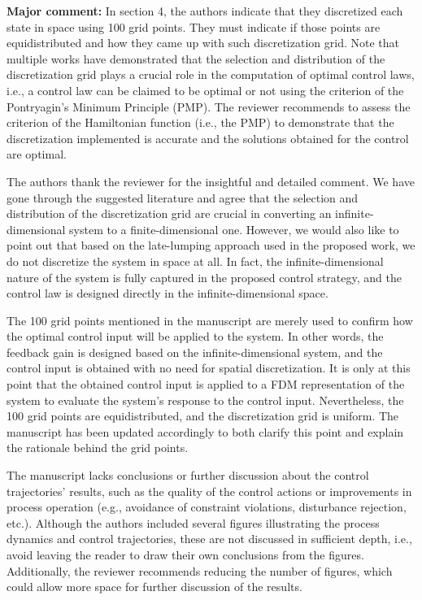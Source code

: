\documentclass[11pt,answers]{exam}
\begin{document}
\begin{questions}

    \question \textbf{Major comment: } In section 4, the authors indicate that they discretized each state in space using 100 grid points. They must indicate if those points are equidistributed and how they came up with such discretization grid. Note that multiple works \cite{palma2023selection, assassa2016optimality, chen2014bilevel} have demonstrated that the selection and distribution of the discretization grid plays a crucial role in the computation of optimal control laws, i.e., a control law can be claimed to be optimal or not using the criterion of the Pontryagin's Minimum Principle (PMP). The reviewer recommends to assess the criterion of the Hamiltonian function (i.e., the PMP) to demonstrate that the discretization implemented is accurate and the solutions obtained for the control are optimal.

    \begin{solutionorbox} \label{comment:3_1}
        The authors thank the reviewer for the insightful and detailed comment. We have gone through the suggested literature and agree that the selection and distribution of the discretization grid are crucial in converting an infinite-dimensional system to a finite-dimensional one. However, we would also like to point out that based on the late-lumping approach used in the proposed work, we do not discretize the system in space at all. In fact, the infinite-dimensional nature of the system is fully captured in the proposed control strategy, and the control law is designed directly in the infinite-dimensional space.

        The 100 grid points mentioned in the manuscript are merely used to confirm how the optimal control input will be applied to the system. In other words, the feedback gain is designed based on the infinite-dimensional system, and the control input is obtained with no need for spatial discretization. It is only at this point that the obtained control input is applied to a FDM representation of the system to evaluate the system's response to the control input. Nevertheless, the 100 grid points are equidistributed, and the discretization grid is uniform. The manuscript has been updated accordingly to both clarify this point and explain the rationale behind the grid points.
    \end{solutionorbox}


    \question The manuscript lacks conclusions or further discussion about the control trajectories' results, such as the quality of the control actions or improvements in process operation (e.g., avoidance of constraint violations, disturbance rejection, etc.). Although the authors included several figures illustrating the process dynamics and control trajectories, these are not discussed in sufficient depth, i.e., avoid leaving the reader to draw their own conclusions from the figures. Additionally, the reviewer recommends reducing the number of figures, which could allow more space for further discussion of the results.


\end{questions}
\end{document}
